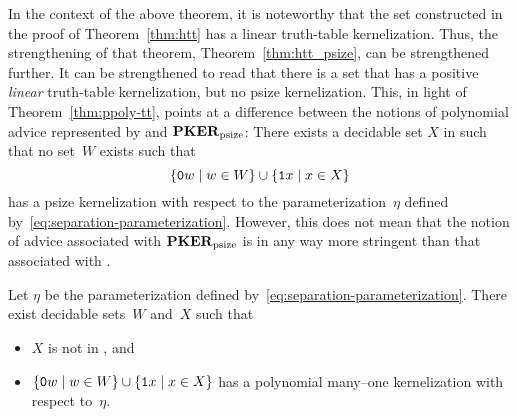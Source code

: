In the context of the above theorem, it is noteworthy that the set constructed in the proof of Theorem~\ref{thm:htt} has a linear truth-table kernelization.
Thus, the strengthening of that theorem, Theorem~\ref{thm:htt_psize}, can be strengthened further.
It can be strengthened to read that there is a set that has a positive \emph{linear} truth-table kernelization, but no psize kernelization.
This, in light of Theorem~\ref{thm:ppoly-tt}, points at a difference between the notions of polynomial advice represented by  and $\textnormal{\textbf{PKER}}_\textnormal{psize}$:
There exists a decidable set $X$ in  such that no set~$W$ exists such that
\begin{equation*}
  \{\textnormal{\texttt{0}}w \;|\; w \in W\} \cup \{\textnormal{\texttt{1}}x \;|\; x \in X\}
\end{equation*}
has a psize kernelization with respect to the parameterization~$\eta$ defined by~\eqref{eq:separation-parameterization}.
However, this does not mean that the notion of advice associated with $\textnormal{\textbf{PKER}}_\textnormal{psize}$ is in any way more stringent than that associated with .
\begin{theorem}
\label{thm:ppoly-one}%
  Let $\eta$ be the parameterization defined by~\eqref{eq:separation-parameterization}.
  There exist decidable sets~$W$ and~$X$ such that
  \begin{itemize}
  \item $X$ is not in , and
  \item $\{\textnormal{\texttt{0}}w \;|\; w \in W\} \cup \{\textnormal{\texttt{1}}x \;|\; x \in X\}$ has a polynomial many--one kernelization with respect to~$\eta$.
  \end{itemize}
\end{theorem}
